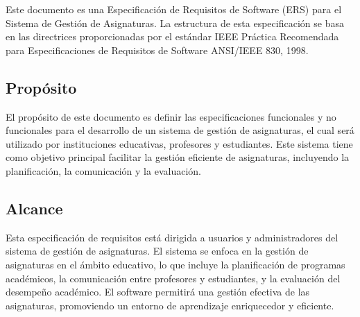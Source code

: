 \documentclass[11pt]{article}
\begin{document}
Este documento es una Especificación de Requisitos de Software (ERS)
para el Sistema de Gestión de Asignaturas. La estructura de esta 
especificación se basa en las directrices proporcionadas por el
estándar IEEE Práctica Recomendada para Especificaciones de 
Requisitos de Software ANSI/IEEE 830, 1998.

\subsection{\textbf{Propósito}}

El propósito de este documento es definir las especificaciones 
funcionales y no funcionales para el desarrollo de un sistema de
gestión de asignaturas, el cual será utilizado por instituciones
educativas, profesores y estudiantes. Este sistema tiene como
objetivo principal facilitar la gestión eficiente de asignaturas,
incluyendo la planificación, la comunicación y la evaluación.

\subsection{\textbf{Alcance}}

Esta especificación de requisitos está dirigida a usuarios y 
administradores del sistema de gestión de asignaturas. El sistema se 
enfoca en la gestión de asignaturas en el ámbito educativo, lo que 
incluye la planificación de programas académicos, la comunicación 
entre profesores y estudiantes, y la evaluación del desempeño 
académico. El software permitirá una gestión efectiva de las 
asignaturas, promoviendo un entorno de aprendizaje enriquecedor y 
eficiente.
\end{document}
